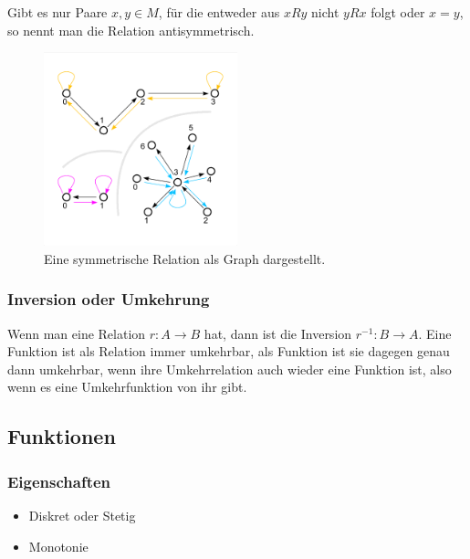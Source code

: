 \documentclass[../main.tex]{subfiles}
\begin{document}
                    Gibt es nur Paare $x, y \in M$, für die entweder aus $xRy$ nicht $yRx$ folgt oder $x = y$, so nennt man die Relation antisymmetrisch.
                    
                    
                    \begin{figure}
                         \centering
                         \includegraphics[width=0.5\textwidth]{Abbildungen/Symmetrie_Graph.png}
                         \caption{Eine symmetrische Relation als Graph dargestellt.}
                         \label{figure:Mathematik:FormaleGrundlagen:Symmetrie_Graph}
                    \end{figure}
                    
            \subsubsection{Inversion oder Umkehrung}
                Wenn man eine Relation $r\colon A \rightarrow B$ hat, dann ist die Inversion $r^{-1}\colon B \rightarrow A$. Eine Funktion ist als Relation immer umkehrbar, als Funktion ist sie dagegen genau dann umkehrbar, wenn ihre Umkehrrelation auch wieder eine Funktion ist, also wenn es eine Umkehrfunktion von ihr gibt.                
                    
                    
        \subsection{Funktionen}
            \subsubsection{Eigenschaften}
                \begin{itemize}
                    \item Diskret oder Stetig
                    \item Monotonie
                \end{itemize}
                
\end{document}
